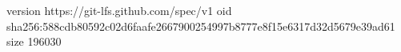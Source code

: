 version https://git-lfs.github.com/spec/v1
oid sha256:588cdb80592c02d6faafe2667900254997b8777e8f15e6317d32d5679e39ad61
size 196030
